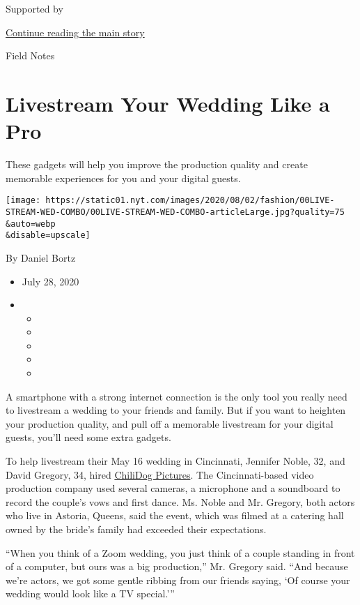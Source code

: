 Supported by

\protect\hyperlink{after-sponsor}{Continue reading the main story}

Field Notes

\hypertarget{livestream-your-wedding-like-a-pro}{%
\section{Livestream Your Wedding Like a
Pro}\label{livestream-your-wedding-like-a-pro}}

These gadgets will help you improve the production quality and create
memorable experiences for you and your digital guests.

\texttt{[image: https://static01.nyt.com/images/2020/08/02/fashion/00LIVE-STREAM-WED-COMBO/00LIVE-STREAM-WED-COMBO-articleLarge.jpg?quality=75\\\&auto=webp\\\&disable=upscale]}

By Daniel Bortz

\begin{itemize}
\item
  July 28, 2020
\item
  \begin{itemize}
  \item
  \item
  \item
  \item
  \item
  \end{itemize}
\end{itemize}

A smartphone with a strong internet connection is the only tool you
really need to livestream a wedding to your friends and family. But if
you want to heighten your production quality, and pull off a memorable
livestream for your digital guests, you'll need some extra gadgets.

To help livestream their May 16 wedding in Cincinnati, Jennifer Noble,
32, and David Gregory, 34, hired
\href{https://www.chilidogpictures.com/}{ChiliDog Pictures}. The
Cincinnati-based video production company used several cameras, a
microphone and a soundboard to record the couple's vows and first dance.
Ms. Noble and Mr. Gregory, both actors who live in Astoria, Queens, said
the event, which was filmed at a catering hall owned by the bride's
family had exceeded their expectations.

``When you think of a Zoom wedding, you just think of a couple standing
in front of a computer, but ours was a big production,'' Mr. Gregory
said. ``And because we're actors, we got some gentle ribbing from our
friends saying, `Of course your wedding would look like a TV special.'''

